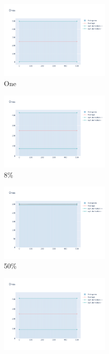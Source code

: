 \documentclass[12pt, fleqn]{report}                             %
\theoremstyle{break}                                            %
\begin{document}
      \begin{figure}[ht!]
        \centering
        \begin{subfigure}[b]{0.4\linewidth}
          \includegraphics[width=0.6\textwidth]{Images/43/dia-a.png}
          \caption{One}
        \end{subfigure}
        \begin{subfigure}[b]{0.4\linewidth}
          \includegraphics[width=0.6\textwidth]{Images/43/dia-b.png}
          \caption{8\%}
        \end{subfigure}
        \begin{subfigure}[b]{0.4\linewidth}
          \includegraphics[width=0.6\textwidth]{Images/43/dia-c.png}
          \caption{50\%}
        \end{subfigure}
        \begin{subfigure}[b]{0.4\linewidth}
          \includegraphics[width=0.6\textwidth]{Images/43/dia-d.png}

\end{subfigure}
\end{figure}
\end{document}
